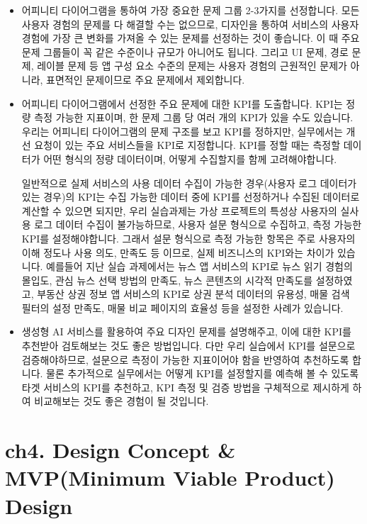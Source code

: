 \documentclass[
  letterpaper,
]{book}
\begin{document}
\begin{itemize}
\item
  어피니티 다이어그램을 통하여 가장 중요한 문제 그룹 2-3가지를
  선정합니다. 모든 사용자 경험의 문제를 다 해결할 수는 없으므로,
  디자인을 통하여 서비스의 사용자 경험에 가장 큰 변화를 가져올 수 있는
  문제를 선정하는 것이 좋습니다. 이 때 주요 문제 그룹들이 꼭 같은
  수준이나 규모가 아니어도 됩니다. 그리고 UI 문제, 경로 문제, 레이블
  문제 등 앱 구성 요소 수준의 문제는 사용자 경험의 근원적인 문제가
  아니라, 표면적인 문제이므로 주요 문제에서 제외합니다.
\item
  어피니티 다이어그램에서 선정한 주요 문제에 대한 KPI를 도출합니다.
  KPI는 정량 측정 가능한 지표이며, 한 문제 그룹 당 여러 개의 KPI가 있을
  수도 있습니다. 우리는 어피니티 다이어그램의 문제 구조를 보고 KPI를
  정하지만, 실무에서는 개선 요청이 있는 주요 서비스들을 KPI로
  지정합니다. KPI를 정할 때는 측정할 데이터가 어떤 형식의 정량
  데이터이며, 어떻게 수집할지를 함께 고려해야합니다.

  일반적으로 실제 서비스의 사용 데이터 수집이 가능한 경우(사용자 로그
  데이터가 있는 경우)의 KPI는 수집 가능한 데이터 중에 KPI를 선정하거나
  수집된 데이터로 계산할 수 있으면 되지만, 우리 실습과제는 가상
  프로젝트의 특성상 사용자의 실사용 로그 데이터 수집이 불가능하므로,
  사용자 설문 형식으로 수집하고, 측정 가능한 KPI를 설정해야합니다.
  그래서 설문 형식으로 측정 가능한 항목은 주로 사용자의 이해 정도나 사용
  의도, 만족도 등 이므로, 실제 비즈니스의 KPI와는 차이가 있습니다.
  예를들어 지난 실습 과제에서는 뉴스 앱 서비스의 KPI로 뉴스 읽기 경험의
  몰입도, 관심 뉴스 선택 방법의 만족도, 뉴스 콘텐츠의 시각적 만족도를
  설정하였고, 부동산 상권 정보 앱 서비스의 KPI로 상권 분석 데이터의
  유용성, 매물 검색 필터의 설정 만족도, 매물 비교 페이지의 효율성 등을
  설정한 사례가 있습니다.
\item
  생성형 AI 서비스를 활용하여 주요 디자인 문제를 설명해주고, 이에 대한
  KPI를 추천받아 검토해보는 것도 좋은 방법입니다. 다만 우리 실습에서
  KPI를 설문으로 검증해야하므로, 설문으로 측정이 가능한 지표이어야 함을
  반영하여 추천하도록 합니다. 물론 추가적으로 실무에서는 어떻게 KPI를
  설정할지를 예측해 볼 수 있도록 타겟 서비스의 KPI를 추천하고, KPI 측정
  및 검증 방법을 구체적으로 제시하게 하여 비교해보는 것도 좋은 경험이 될
  것입니다.
\end{itemize}

\chapter{ch4. Design Concept \& MVP(Minimum Viable Product)
Design}\label{ch4.-design-concept-mvpminimum-viable-product-design}
\end{document}
